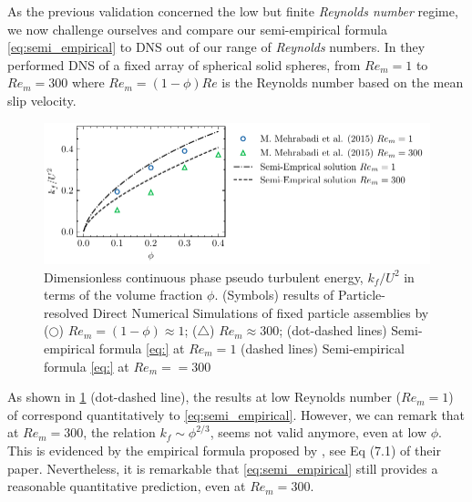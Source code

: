 As the previous validation concerned the low but finite \textit{Reynolds number} regime, we now challenge ourselves and compare our semi-empirical formula \eqref{eq:semi_empirical} to DNS out of our range of \textit{Reynolds} numbers. 
In \citet{mehrabadi2015pseudo} they performed DNS of a fixed array of spherical solid spheres, from $Re_m = 1$ to $Re_m=300$ where $Re_m = (1- \phi) Re$ is the Reynolds number based on the mean slip velocity. 
\begin{figure}
    \centering
    \includegraphics[height = 0.25\textwidth]{image/HOMOGENEOUS_final/CA/tenneti.pdf}
    \caption{Dimensionless continuous phase pseudo turbulent energy, $k_f/U^2$ in terms of the volume fraction $\phi$.
    (Symbols) 
    results of Particle-resolved Direct Numerical Simulations
    of fixed particle assemblies by \citet{mehrabadi2015pseudo}
    ($\pmb\bigcirc$) $Re_m = (1-\phi) \approx 1$; ($\pmb\triangle$) $Re_m \approx 300$;
    (dot-dashed lines) Semi-empirical formula \ref{eq:} at $Re_m = 1$
    (dashed lines) Semi-empirical formula \ref{eq:} at $Re_m= = 300$
    }
    \label{fig:tennet}
\end{figure}
As shown in \ref{fig:tennet} (dot-dashed line), the results at low Reynolds number ($Re_m=1$) of \citet{mehrabadi2015pseudo}  correspond quantitatively to \eqref{eq:semi_empirical}. 
However, we can remark that at $Re_m = 300$, the relation $k_f \sim \phi^{2/3}$, seems not valid anymore, even at low $\phi$. 
This is evidenced by the empirical formula proposed by \citet{mehrabadi2015pseudo}, see Eq (7.1) of their paper. 
Nevertheless, it is remarkable that \ref{eq:semi_empirical} still provides a reasonable quantitative prediction, even at $Re_m = 300$. 


